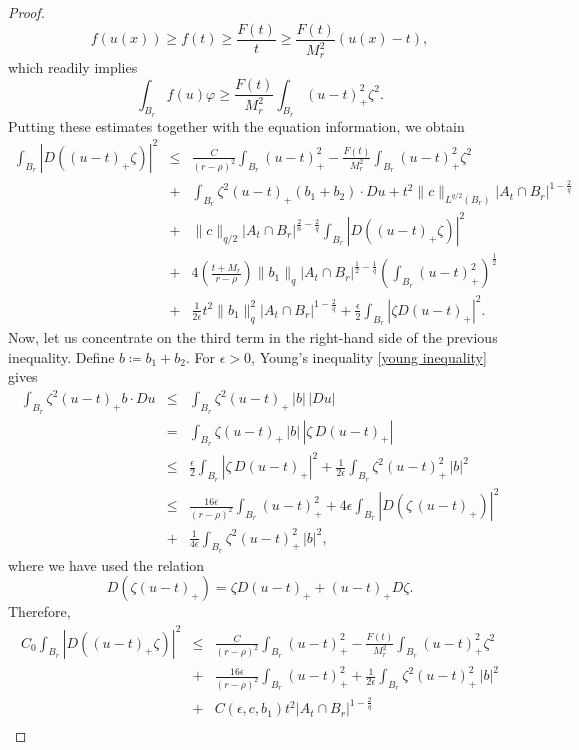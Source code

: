 \documentclass[12pt,a4paper]{amsart}
\numberwithin{equation}{section} %
\theoremstyle{definition}
\theoremstyle{remark}
\begin{document}
\begin{proof}
$$
    f(u(x)) \geq f(t) \geq \frac{F(t)}{t} \geq \frac{F(t)}{M_r^2}(u(x)-t),
$$
which readily implies
$$
    \int_{B_r} f(u)\varphi \geq \frac{F(t)}{M_r^2}\int_{B_r}(u-t)_+^2\zeta^2.
$$
Putting these estimates together with the equation information, we obtain
\begin{eqnarray*}
    \int_{B_r}|D\left((u-t)_+\zeta \right)|^2& \leq& \frac{C}{(r-\rho)^2} \int_{B_r} (u-t)_+^2 - \frac{F(t)}{M_r^2}\int_{B_r}(u-t)_+^2\zeta^2\\
    & +& \int_{B_r} \zeta^2 (u-t)_+ (b_1 + b_2) \cdot Du + t^2\|c\|_{L^{q/2}(B_r)} |A_t \cap B_r|^{1-\frac{2}{q}}\\
    & + & \|c\|_{q/2}|A_t\cap B_r|^{\frac{2}{n}-\frac{2}{q}}\int_{B_r}|D((u-t)_+\zeta)|^2\\
    & + & 4\left(\frac{t+M_r}{r-\rho}\right)\|b_1\|_{q}|A_t \cap B_r|^{\frac{1}{2} - \frac{1}{q}}\left(\int_{B_r}(u-t)^2_+ \right)^{\frac{1}{2}}\\
    & + & \frac{1}{2\epsilon}t^2\|b_1\|^2_{q}|A_t \cap B_r|^{1 - \frac{2}{q}} + \frac{\epsilon}{2}\int_{B_r}|\zeta D(u-t)_+|^2.
\end{eqnarray*}
Now, let us concentrate on the third term in the right-hand side of the previous inequality. Define $b \coloneqq b_1 + b_2$. For $\epsilon > 0$, Young's inequality \eqref{young inequality} gives
\begin{eqnarray*}
    \int_{B_r} \zeta^2 (u-t)_+b \cdot Du & \leq & \int_{B_r} \zeta^2 (u-t)_+\,|b| \, |Du|\\
    & = &  \int_{B_r}  \zeta(u-t)_+\,|b| \, |\zeta\, D(u-t)_+|\\
    & \leq & \frac{\epsilon}{2} \int_{B_r}  |\zeta\, D(u-t)_+|^2 + \frac{1}{2\epsilon} \int_{B_r}  \zeta^2(u-t)^2_+\,|b|^2\\
    & \leq & \frac{16\epsilon}{(r-\rho)^2}\int_{B_r} (u-t)_+^2 + 4\epsilon \int_{B_r} |D(\zeta\, (u-t)_+)|^2\\
    & + &  \frac{1}{4\epsilon} \int_{B_r}  \zeta^2(u-t)^2_+\,|b|^2,
\end{eqnarray*}
where we have used the relation
$$
    D(\zeta(u-t)_+) = \zeta D(u-t)_+ + (u-t)_+D\zeta.
$$
Therefore,
\begin{eqnarray*}
    C_0\int_{B_r}|D\left((u-t)_+\zeta \right)|^2& \leq& \frac{C}{(r-\rho)^2} \int_{B_r} (u-t)_+^2 - \frac{F(t)}{M_r^2}\int_{B_r}(u-t)_+^2\zeta^2\\
    & +& \frac{16\epsilon}{(r-\rho)^2}\int_{B_r} (u-t)_+^2 + \frac{1}{2\epsilon} \int_{B_r}  \zeta^2(u-t)^2_+\,|b|^2\\
    & + & C(\epsilon,c,b_1)t^2 |A_t \cap B_r|^{1 - \frac{2}{q}}\\

\end{eqnarray*}
\end{proof}
\end{document}
